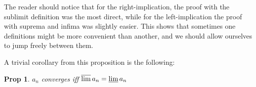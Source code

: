 \documentclass{article}
\newtheorem{prop}{Prop}
\theoremstyle{definition}
\begin{document}
	The reader should notice that for the right-implication, the proof with the sublimit definition was the most direct, while for the left-implication the proof with suprema and infima was slightly easier. This shows that sometimes one definitions might be more convenient than another, and we should allow ourselves to jump freely between them.
	
	A trivial corollary from this proposition is the following:
	
	\begin{prop}
	$a_n$ converges iff $\varlimsup a_n = \varliminf a_n$
	\end{prop}
\end{document}
